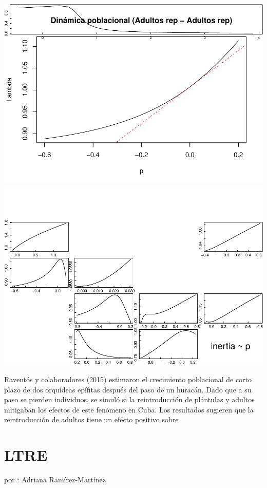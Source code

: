 \documentclass[
]{book}
\theoremstyle{definition}
\theoremstyle{definition}
\theoremstyle{definition}
\theoremstyle{definition}
\theoremstyle{remark}
\begin{document}
\includegraphics{Diagnostico_Poblacional_files/figure-latex/chap10_6-10.pdf} \includegraphics{Diagnostico_Poblacional_files/figure-latex/chap10_6-11.pdf}

Raventós y colaboradores (2015) estimaron el crecimiento poblacional de corto plazo de dos orquídeas epífitas después del paso de un huracán. Dado que a su paso se pierden individuos, se simuló si la reintroducción de plántulas y adultos mitigaban los efectos de este fenómeno en Cuba. Los resultados sugieren que la reintroducción de adultos tiene un efecto positivo sobre

\chapter{LTRE}\label{ltre}

por : Adriana Ramírez-Martínez
\end{document}
